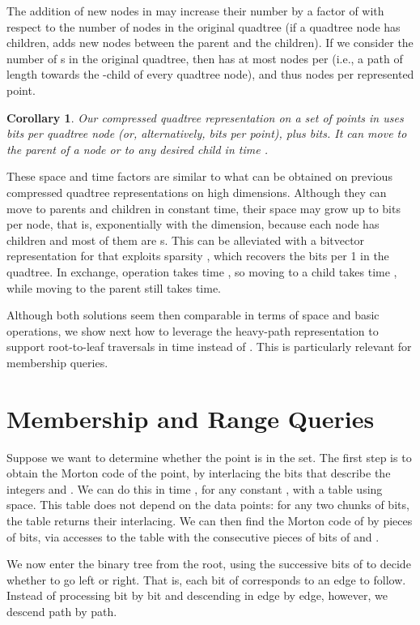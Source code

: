 \documentclass{elsarticle}
\newtheorem{corollary}[theorem]{Corollary}
\begin{document}
The addition of new nodes in  may increase their number by a factor of  with respect to the number of nodes in the original quadtree (if a quadtree node has  children,  adds  new nodes between the parent and the children). If we consider the number of s in the original quadtree, then  has at most  nodes per  (i.e., a path of length  towards the -child of every quadtree node), and thus  nodes per represented point.

\begin{corollary}
Our compressed quadtree representation on a set of points in  uses  bits per quadtree node (or, alternatively,  bits per point), plus  bits. It can move to the parent of a node or to any desired child in time .
\end{corollary}

These space and time factors are similar to what can be obtained on previous compressed quadtree representations \cite{BLN14,Nav16} on high dimensions. Although they can move to parents and children in constant time, their space may grow up to  bits per node, that is, exponentially with the dimension, because each node has  children and most of them are s. This can be alleviated with a bitvector representation for  that exploits sparsity \cite{OS07}, which recovers the  bits per 1 in the quadtree. In exchange, operation  takes time , so moving to a child takes time , while moving to the
parent still takes  time.

Although both solutions seem then comparable in terms of space and basic operations, we show next how to leverage the heavy-path representation to support root-to-leaf traversals in time  instead of . This is particularly relevant for membership queries. 


\section{Membership and Range Queries}
\label{sec:membership}

Suppose we want to determine whether the point  is in the set. The first step is to obtain the Morton code  of the point, by interlacing the bits that describe the integers  and . We can do this in time , for any constant , with a table using  space. This table does not depend on the data points: for any two chunks of  bits, the table returns their interlacing. We can then find the Morton code of  by pieces of  bits, via  accesses to the table with the consecutive pieces of  bits of  and .

We now enter the binary tree  from the root, using the successive bits of  to
decide whether to go left or right. That is, each bit of  corresponds to an edge to follow.
Instead of processing  bit by bit and descending in  edge by edge, however, we descend path by path. 
\end{document}
